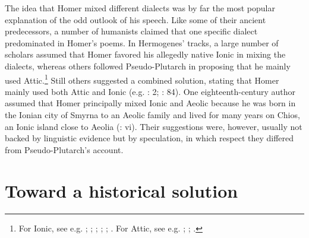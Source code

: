 The idea that Homer mixed different dialects was by far the most popular explanation of the odd outlook of his speech. Like some of their ancient predecessors, a number of humanists claimed that one specific dialect predominated in Homer’s poems. In Hermogenes’ tracks, a large number of scholars assumed that Homer favored his allegedly native Ionic in mixing the dialects, whereas others followed Pseudo-Plutarch in proposing that he mainly used Attic.\footnote{For Ionic, see e.g. \citet[47\textsc{\textsuperscript{r}}]{Da1509}; \citet[215]{Ringelbergh1541}; \citet[167]{Labbe1639}; \citet[\textsc{b.3}\textsc{\textsuperscript{v}}]{KirchmaierCrusius1684}; \citet[b.2\textsc{\textsuperscript{r}}, 334]{Nibbe1725}; \citet[161]{Gesner1774}. For Attic, see e.g. \citet[\textsc{f.}v\textsc{\textsuperscript{r}}]{Codro1502}; \citet[96\textsc{\textsuperscript{r}}]{Waser1610}; \citet[514]{Fabricius1711}.} Still others suggested a combined solution, stating that Homer mainly used both Attic and Ionic (e.g. \citealt{Schmidt1604}: 2; \citealt{Rhenius1626}: 84). One eighteenth-century author assumed that Homer principally mixed Ionic and Aeolic because he was born in the Ionian city of Smyrna to an Aeolic family and lived for many years on Chios, an Ionic island close to Aeolia (\citealt{Reynolds1752}: vi). Their suggestions were, however, usually not backed by linguistic evidence but by speculation, in which respect they differed from Pseudo-Plutarch’s account.

\section{Toward a historical solution}\label{sec:4.3}

